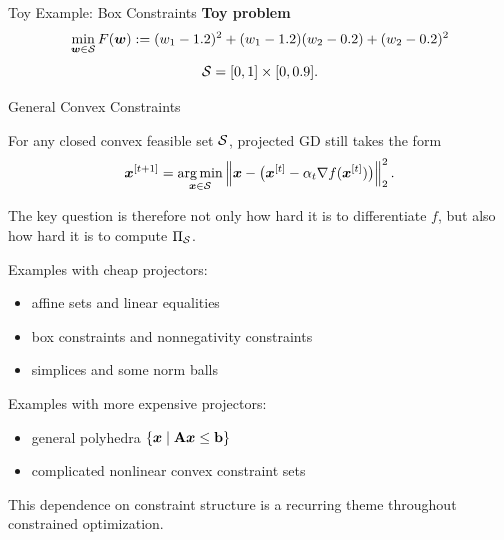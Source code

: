 \documentclass[11pt,compress,t,notes=noshow, xcolor=table]{beamer}
\begin{document}
\begin{framev}[fs=scriptsize]{Toy Example: Box Constraints}
\textbf{Toy problem}
$$
\min_{\wv \in \S}
F(\wv)
:=
(w_1 - 1.2)^2
+
(w_1 - 1.2)(w_2 - 0.2)
+
(w_2 - 0.2)^2
$$
$$
\S = [0,1] \times [0,0.9].
$$

\end{framev}


\begin{framei}[fs=small]{General Convex Constraints}
\item For any closed convex feasible set $\S$, projected GD still takes the form
$$
\xv^{[t+1]} = \argmin_{\xv \in \S} \left\| \xv - \big(\xv^{[t]} - \alpha_t \nabla f(\xv^{[t]})\big) \right\|_2^2.
$$
\item The key question is therefore not only how hard it is to differentiate $f$, but also how hard it is to compute $\Pi_{\S}$.
\item Examples with cheap projectors:
\begin{itemize}
\item affine sets and linear equalities
\item box constraints and nonnegativity constraints
\item simplices and some norm balls
\end{itemize}
\item Examples with more expensive projectors:
\begin{itemize}
\item general polyhedra $\{\xv \mid \Amat \xv \le \bv\}$
\item complicated nonlinear convex constraint sets
\end{itemize}
\item This dependence on constraint structure is a recurring theme throughout constrained optimization.
\end{framei}
\end{document}
